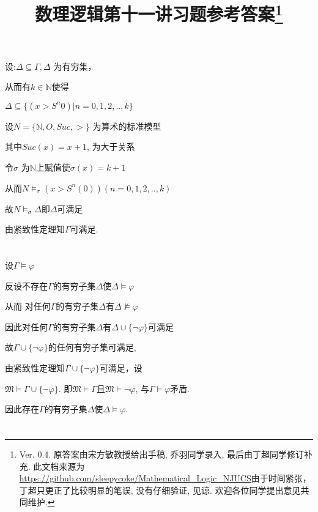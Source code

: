 \documentclass{article}
\begin{document}
\title{数理逻辑第十一讲习题参考答案\footnote{Ver. 0.4. 原答案由宋方敏教授给出手稿, 乔羽同学录入, 最后由丁超同学修订补充. 此文档来源为\url{https://github.com/sleepycoke/Mathematical_Logic_NJUCS}由于时间紧张，丁超只更正了比较明显的笔误, 没有仔细验证, 见谅. 
 欢迎各位同学提出意见共同维护. 
}}
\maketitle

\section{}

设:$\Delta \subseteq \Gamma, \Delta$ 为有穷集，

从而有$k \in \mathbb{N} $使得

$\Delta \subseteq \{ (x > S^n0) | n=0,1,2,..,k\}$

设$N = \{ \mathbb{N},O,Suc , >  \}$ 为算术的标准模型

其中$ Suc (x) =x+1 $, $ $为大于关系

令$\sigma$ 为$\mathbb{N}$上赋值使$\sigma (x) = k+1$

从而$N \vDash_\sigma (x>S^n(0))(n=0,1,2,..,k)$

故$N \vDash_\sigma \Delta$即$\Delta$可满足

由紧致性定理知$\Gamma$可满足.

\section{}


设$\Gamma \vDash \varphi$

反设不存在$\Gamma$的有穷子集$\Delta$使$\Delta \vDash \varphi$

从而 对任何$\Gamma$的有穷子集$\Delta$有$\Delta \nvDash \varphi$

因此对任何$\Gamma$的有穷子集$\Delta$有$\Delta \cup \{\neg \varphi\}$可满足

故$\Gamma \cup \{\neg \varphi\}$的任何有穷子集可满足,

由紧致性定理知$\Gamma \cup \{\neg \varphi\}$可满足，设

$\mathfrak{M} \vDash \Gamma \cup\{\neg \varphi\}$. 即$\mathfrak{M} \vDash \Gamma$且$\mathfrak{M} \vDash \neg\varphi$, 与$\Gamma \models \varphi$矛盾. 

因此存在$\Gamma$的有穷子集$\Delta$使$\Delta \models \varphi$. 

\section{}
\end{document}
